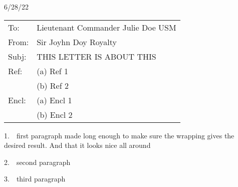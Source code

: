 \documentclass[letter,12pt]{letter}
\begin{document}
\hfill 6/28/22
\begin{tabular}{p{0.5in}p{6in}}
To: & Lieutenant Commander Julie Doe USM \\
From: & Sir Joyhn Doy Royalty \\[12pt]
Subj: & THIS LETTER IS ABOUT THIS \\[12pt]
Ref: & (a) Ref 1 \\

      & (b) Ref 2 \\
[12pt]
Encl: & (a) Encl 1 \\


      & (b) Encl 2 \\
[12pt]

\end{tabular}


1.\ \  first paragraph made long enough to make sure the wrapping gives the desired result. And that it looks nice all around\par

2.\ \  second paragraph\par

3.\ \  third paragraph\par
\end{document}
